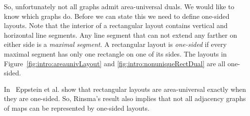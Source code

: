   So, unfortunately not all graphs admit area-universal duals.
  We would like to know which graphs do.
  Before we can state this we need to define one-sided layouts.
  Note that the interior of a rectangular layout contains vertical and horizontal line segments.
  Any line segment that can not extend any farther on either side is a \emph{maximal segment}.
  A rectangular layout is \emph{one-sided} if every maximal segment has only one rectangle on one of its sides.
  The layouts in Figure~\ref{fig:intro:areaunivLayout} and  \ref{fig:intro:nonuniqueRectDual} are all one-sided.

  In~\cite{Eppstein2012} Eppstein et al. show that rectangular layouts are area-universal exactly when they are one-sided.
  So, Rinsma's result also implies that not all adjacency graphs of maps can be represented by one-sided layouts.



